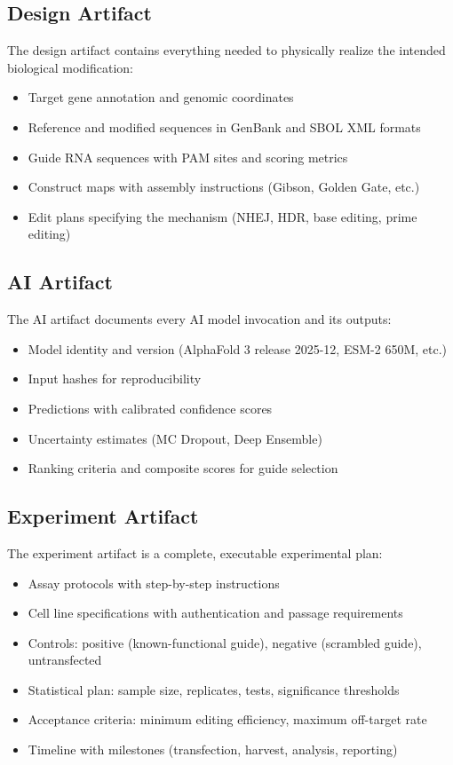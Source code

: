 \documentclass[12pt,a4paper]{article}
\begin{document}
\subsection{Design Artifact}

The design artifact contains everything needed to physically realize the intended biological modification:

\begin{itemize}
    \item Target gene annotation and genomic coordinates
    \item Reference and modified sequences in GenBank and SBOL XML formats
    \item Guide RNA sequences with PAM sites and scoring metrics
    \item Construct maps with assembly instructions (Gibson, Golden Gate, etc.)
    \item Edit plans specifying the mechanism (NHEJ, HDR, base editing, prime editing)
\end{itemize}

\subsection{AI Artifact}

The AI artifact documents every AI model invocation and its outputs:

\begin{itemize}
    \item Model identity and version (AlphaFold 3 release 2025-12, ESM-2 650M, etc.)
    \item Input hashes for reproducibility
    \item Predictions with calibrated confidence scores
    \item Uncertainty estimates (MC Dropout, Deep Ensemble)
    \item Ranking criteria and composite scores for guide selection
\end{itemize}

\subsection{Experiment Artifact}

The experiment artifact is a complete, executable experimental plan:

\begin{itemize}
    \item Assay protocols with step-by-step instructions
    \item Cell line specifications with authentication and passage requirements
    \item Controls: positive (known-functional guide), negative (scrambled guide), untransfected
    \item Statistical plan: sample size, replicates, tests, significance thresholds
    \item Acceptance criteria: minimum editing efficiency, maximum off-target rate
    \item Timeline with milestones (transfection, harvest, analysis, reporting)
\end{itemize}
\end{document}
